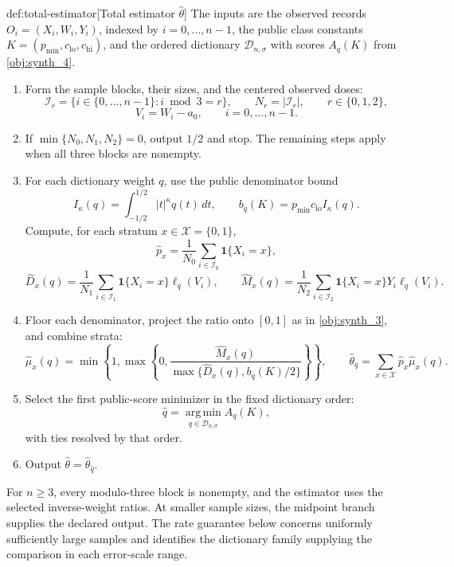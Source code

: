 \begin{algorithmv}{def:total-estimator}[Total estimator $\widehat\theta$]
The inputs are the observed records \(O_i=(X_i,W_i,Y_i)\), indexed by \(i=0,\ldots,n-1\), the public class constants \(K=(p_{\min},c_{\mathrm{lo}},c_{\mathrm{hi}})\), and the ordered dictionary \(\mathcal D_{n,\sigma}\) with scores \(A_q(K)\) from \cref{obj:synth_4}.
\begin{enumerate}
\item Form the sample blocks, their sizes, and the centered observed doses:
\[
\mathcal I_r
=\{i\in\{0,\ldots,n-1\}:i\bmod3=r\},
\qquad
N_r=|\mathcal I_r|,
\qquad r\in\{0,1,2\},
\]
\[
V_i=W_i-a_0,\qquad i=0,\ldots,n-1.
\]
\item If \(\min\{N_0,N_1,N_2\}=0\), output \(1/2\) and stop. The remaining steps apply when all three blocks are nonempty.
\item For each dictionary weight \(q\), use the public denominator bound
\[
I_\kappa(q)=\int_{-1/2}^{1/2}|t|^\kappa q(t)\,dt,
\qquad
b_q(K)=p_{\min}c_{\mathrm{lo}}I_\kappa(q).
\]
Compute, for each stratum \(x\in\mathcal X=\{0,1\}\),
\[
\widehat p_x
=\frac1{N_0}\sum_{i\in\mathcal I_0}\mathbf1\{X_i=x\},
\]
\[
\widehat D_x(q)
=\frac1{N_1}\sum_{i\in\mathcal I_1}
\mathbf1\{X_i=x\}\ell_q(V_i),
\qquad
\widehat M_x(q)
=\frac1{N_2}\sum_{i\in\mathcal I_2}
\mathbf1\{X_i=x\}Y_i\ell_q(V_i).
\]
\item Floor each denominator, project the ratio onto \([0,1]\) as in \cref{obj:synth_3}, and combine strata:
\[
\widehat\mu_x(q)
=\min\left\{1,\max\left\{0,
\frac{\widehat M_x(q)}
{\max\{\widehat D_x(q),b_q(K)/2\}}
\right\}\right\},
\qquad
\widehat\theta_q
=\sum_{x\in\mathcal X}\widehat p_x\widehat\mu_x(q).
\]
\item Select the first public-score minimizer in the fixed dictionary order:
\[
\widehat q
=\operatorname*{arg\,min}_{q\in\mathcal D_{n,\sigma}}A_q(K),
\]
with ties resolved by that order.
\item Output \(\widehat\theta=\widehat\theta_{\widehat q}\).
\end{enumerate}
\end{algorithmv}

For \(n\ge3\), every modulo-three block is nonempty, and the estimator uses the selected inverse-weight ratios. At smaller sample sizes, the midpoint branch supplies the declared output. The rate guarantee below concerns uniformly sufficiently large samples and identifies the dictionary family supplying the comparison in each error-scale range.

